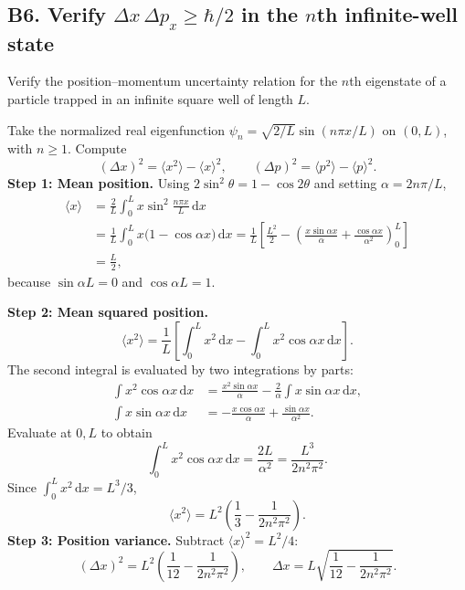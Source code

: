 \documentclass[11pt,a4paper]{article}
\newcommand{\dd}{\mathrm{d}}
\begin{document}
\subsection{B6. Verify $\Delta x\,\Delta p_x\geq\hbar/2$ in the $n$th infinite-well state}
\begin{questionbox}
Verify the position--momentum uncertainty relation for the $n$th eigenstate of a particle trapped in an infinite square well of length $L$.
\end{questionbox}
Take the normalized real eigenfunction $\psi_n=\sqrt{2/L}\sin(n\pi x/L)$ on $(0,L)$, with $n\geq1$. Compute
\begin{equation}
(\Delta x)^2=\langle x^2\rangle-\langle x\rangle^2,\qquad
(\Delta p)^2=\langle p^2\rangle-\langle p\rangle^2.
\end{equation}
\textbf{Step 1: Mean position.} Using $2\sin^2\theta=1-\cos2\theta$ and setting $\alpha=2n\pi/L$,
\begin{align}
\langle x\rangle&=\frac2L\int_0^Lx\sin^2\frac{n\pi x}{L}\,\dd x\\
&=\frac1L\int_0^Lx\bigl(1-\cos\alpha x\bigr)\,\dd x
=\frac1L\left[\frac{L^2}{2}-\left(\frac{x\sin\alpha x}{\alpha}+\frac{\cos\alpha x}{\alpha^2}\right)_0^L\right]\\
&=\boxed{\frac L2},
\end{align}
because $\sin\alpha L=0$ and $\cos\alpha L=1$.

\textbf{Step 2: Mean squared position.}
\begin{equation}
\langle x^2\rangle=\frac1L\left[\int_0^Lx^2\,\dd x-\int_0^Lx^2\cos\alpha x\,\dd x\right].
\end{equation}
The second integral is evaluated by two integrations by parts:
\begin{align}
\int x^2\cos\alpha x\,\dd x&=\frac{x^2\sin\alpha x}{\alpha}-\frac2\alpha\int x\sin\alpha x\,\dd x,\\
\int x\sin\alpha x\,\dd x&=-\frac{x\cos\alpha x}{\alpha}+\frac{\sin\alpha x}{\alpha^2}.
\end{align}
Evaluate at $0,L$ to obtain
\begin{equation}
\int_0^Lx^2\cos\alpha x\,\dd x=\frac{2L}{\alpha^2}=\frac{L^3}{2n^2\pi^2}.
\end{equation}
Since $\int_0^Lx^2\,\dd x=L^3/3$,
\begin{equation}
\boxed{\langle x^2\rangle=L^2\left(\frac13-\frac1{2n^2\pi^2}\right).}
\end{equation}
\textbf{Step 3: Position variance.} Subtract $\langle x\rangle^2=L^2/4$:
\begin{equation}
\boxed{(\Delta x)^2=L^2\left(\frac1{12}-\frac1{2n^2\pi^2}\right),\qquad
\Delta x=L\sqrt{\frac1{12}-\frac1{2n^2\pi^2}}.}
\end{equation}
\end{document}
